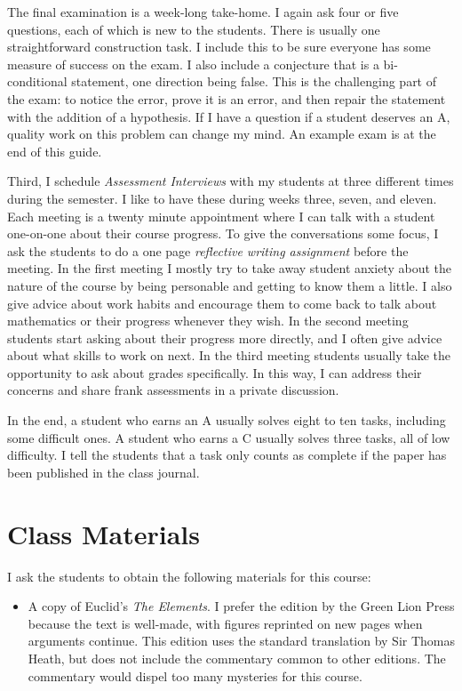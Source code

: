 \begin{annotation}
The final examination is a week-long take-home.
I again ask four or five questions, each of which is new to the students.
There is usually one straightforward construction task.
I include this to be sure everyone has some measure of success on the exam.
I also include a conjecture that is a bi-conditional statement, one direction being false.
This is the challenging part of the exam: to notice the error, prove it is an error, and then repair the statement with the addition of a hypothesis.
If I have a question if a student deserves an A, quality work on this problem can change my mind.
An example exam is at the end of this guide.

Third, I schedule \emph{Assessment Interviews} with my students at three different times during the semester. I like to have these during weeks three, seven, and eleven. Each meeting is a twenty minute appointment where I can talk with a student one-on-one about their course progress. To give the conversations some focus, I ask the students to do a one page \emph{reflective writing assignment} before the meeting.
In the first meeting I mostly try to take away student anxiety about the nature of the course by being personable and getting to know them a little. I also give advice about work habits and encourage them to come back to talk about mathematics or their progress whenever they wish. In the second meeting students start asking about their progress more directly, and I often give advice about what skills to work on next. In the third meeting students usually take the opportunity to ask about grades specifically. In this way, I can address their concerns and share frank assessments in a private discussion.

In the end, a student who earns an A usually solves eight to ten tasks, including some difficult ones. A student who earns a C usually solves three tasks, all of low difficulty. I tell the students that a task only counts as complete if the paper has been published in the class journal.

\section*{Class Materials}

I ask the students to obtain the following materials for this course:
\begin{itemize}
\item A copy of Euclid's \emph{The Elements}. I prefer the edition by the Green Lion Press\cite{Euclid} because the text is well-made, with figures reprinted on new pages when arguments continue. This edition uses the standard translation by Sir Thomas Heath, but does not include the commentary common to other editions. The commentary would dispel too many mysteries for this course.


\end{itemize}
\end{annotation}
